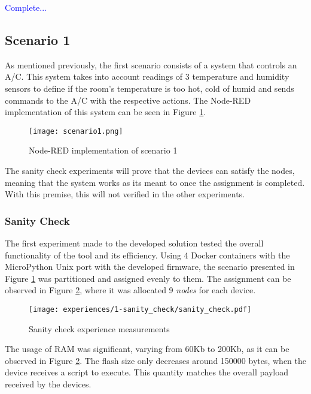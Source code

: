 \textcolor{blue}{Complete...}

\subsection{Scenario 1}\label{sec:discussion_scenario1}

As mentioned previously, the first scenario consists of a system that controls an A/C. This system takes into account readings of 3 temperature and humidity sensors to define if the room's temperature is too hot, cold of humid and sends commands to the A/C with the respective actions. The Node-RED implementation of this system can be seen in Figure \ref{fig:scenario1_node_red}.

\begin{figure}[h]
\centering
\texttt{[image: scenario1.png]}
\caption[Node-RED implementation of scenario 1]{Node-RED implementation of scenario 1}\label{fig:scenario1_node_red}
\end{figure}

The sanity check experiments will prove that the devices can satisfy the nodes, meaning that the system works as its meant to once the assignment is completed. With this premise, this will not verified in the other experiments.


\subsubsection{Sanity Check}\label{sec:sanity_check_exp}

The first experiment made to the developed solution tested the overall functionality of the tool and its efficiency. Using 4 Docker containers with the MicroPython Unix port with the developed firmware, the scenario presented in Figure \ref{fig:scenario1_node_red} was partitioned and assigned evenly to them. The assignment can be observed in Figure \ref{fig:sanity_check_graph}, where it was allocated 9 \textit{nodes} for each device.

\begin{figure}[h]
\centering
\texttt{[image: experiences/1-sanity\_check/sanity\_check.pdf]}
\caption[Sanity check experience measurements]{Sanity check experience measurements}\label{fig:sanity_check_graph}
\end{figure}

The usage of RAM was significant, varying from 60Kb to 200Kb, as it can be observed in Figure \ref{fig:sanity_check_graph}. The flash size only decreases around 150000 bytes, when the device receives a script to execute. This quantity matches the overall payload received by the devices.

